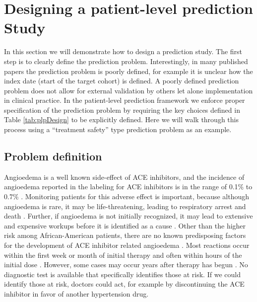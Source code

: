 \documentclass[11pt]{book}
\theoremstyle{definition}
\theoremstyle{definition}
\theoremstyle{definition}
\theoremstyle{remark}
\begin{document}
\hypertarget{designing-a-patient-level-prediction-study}{%
\section{Designing a patient-level prediction Study}\label{designing-a-patient-level-prediction-study}}

In this section we will demonstrate how to design a prediction study. The first step is to clearly define the prediction problem. Interestingly, in many published papers the prediction problem is poorly defined, for example it is unclear how the index date (start of the target cohort) is defined. A poorly defined prediction problem does not allow for external validation by others let alone implementation in clinical practice. In the patient-level prediction framework we enforce proper specification of the prediction problem by requiring the key choices defined in Table \ref{tab:plpDesign} to be explicitly defined. Here we will walk through this process using a ``treatment safety'' type prediction problem as an example. 

\hypertarget{problem-definition-2}{%
\subsection{Problem definition}\label{problem-definition-2}}

Angioedema is a well known side-effect of ACE inhibitors, and the incidence of angioedema reported in the labeling for ACE inhibitors is in the range of 0.1\% to 0.7\% \citep{byrd_2006}. Monitoring patients for this adverse effect is important, because although angioedema is rare, it may be life-threatening, leading to respiratory arrest and death \citep{norman_2013}. Further, if angioedema is not initially recognized, it may lead to extensive and expensive workups before it is identified as a cause \citep{norman_2013, thompson_1993}. Other than the higher risk among African-American patients, there are no known predisposing factors for the development of ACE inhibitor related angioedema \citep{byrd_2006}. Most reactions occur within the first week or month of initial therapy and often within hours of the initial dose \citep{circardi_2004}. However, some cases may occur years after therapy has begun \citep{mara_1996}. No diagnostic test is available that specifically identifies those at risk. If we could identify those at risk, doctors could act, for example by discontinuing the ACE inhibitor in favor of another hypertension drug.  
\end{document}
